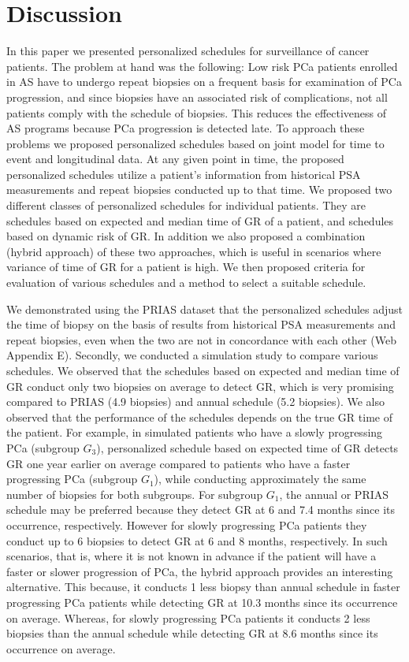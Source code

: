 
\section{Discussion}
\label{sec: discussion}
In this paper we presented personalized schedules for surveillance of cancer patients. The problem at hand was the following: Low risk PCa patients enrolled in AS have to undergo repeat biopsies on a frequent basis for examination of PCa progression, and since biopsies have an associated risk of complications, not all patients comply with the schedule of biopsies. This reduces the effectiveness of AS programs because PCa progression is detected late. To approach these problems we proposed personalized schedules based on joint model for time to event and longitudinal data. At any given point in time, the proposed personalized schedules utilize a patient's information from historical PSA measurements and repeat biopsies conducted up to that time. We proposed two different classes of personalized schedules for individual patients. They are schedules based on expected and median time of GR of a patient, and schedules based on dynamic risk of GR. In addition we also proposed a combination (hybrid approach) of these two approaches, which is useful in scenarios where variance of time of GR for a patient is high. We then proposed criteria for evaluation of various schedules and a method to select a suitable schedule.

We demonstrated using the PRIAS dataset that the personalized schedules adjust the time of biopsy on the basis of results from historical PSA measurements and repeat biopsies, even when the two are not in concordance with each other (Web Appendix E). Secondly, we conducted a simulation study to compare various schedules. We observed that the schedules based on expected and median time of GR conduct only two biopsies on average to detect GR, which is very promising compared to PRIAS (4.9 biopsies) and annual schedule (5.2 biopsies). We also observed that the performance of the schedules depends on the true GR time of the patient. For example, in simulated patients who have a slowly progressing PCa (subgroup $G_3$), personalized schedule based on expected time of GR detects GR one year earlier on average compared to patients who have a faster progressing PCa (subgroup $G_1$), while conducting approximately the same number of biopsies for both subgroups. For subgroup $G_1$, the annual or PRIAS schedule may be preferred because they detect GR at 6 and 7.4 months since its occurrence, respectively. However for slowly progressing PCa patients they conduct up to 6 biopsies to detect GR at 6 and 8 months, respectively. In such scenarios, that is, where it is not known in advance if the patient will have a faster or slower progression of PCa, the hybrid approach provides an interesting alternative. This because, it conducts 1 less biopsy than annual schedule in faster progressing PCa patients while detecting GR at 10.3 months since its occurrence on average. Whereas, for slowly progressing PCa patients it conducts 2 less biopsies than the annual schedule while detecting GR at 8.6 months since its occurrence on average.

